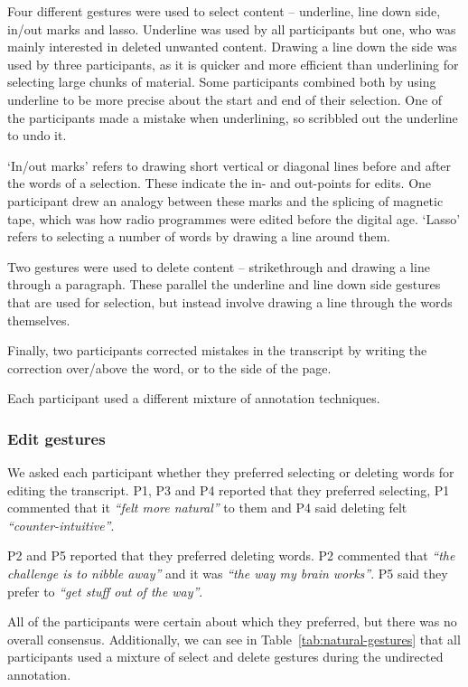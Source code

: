 Four different gestures were used to select content -- underline, line down side, in/out marks and lasso.  Underline
was used by all participants but one, who was mainly interested in deleted unwanted content.  Drawing a line down the
side was used by three participants, as it is quicker and more efficient than underlining for selecting large chunks of
material.  Some participants combined both by using underline to be more precise about the start and end of their
selection.  One of the participants made a mistake when underlining, so scribbled out the underline to undo it.

`In/out marks' refers to drawing short vertical or diagonal lines before and after the words of a selection. These
indicate the in- and out-points for edits. One participant drew an analogy between these marks and the splicing of
magnetic tape, which was how radio programmes were edited before the digital age. `Lasso' refers to selecting a number
of words by drawing a line around them.

Two gestures were used to delete content -- strikethrough and drawing a line through a paragraph. These parallel the
underline and line down side gestures that are used for selection, but instead involve drawing a line through the words
themselves.

Finally, two participants corrected mistakes in the transcript by writing the correction over/above the
word, or to the side of the page.

Each participant used a different mixture of annotation techniques.

\subsubsection{Edit gestures}\label{sec:paper-proto-edit-gestures}
We asked each participant whether they preferred selecting or deleting words for editing the transcript.  P1, P3 and P4
reported that they preferred selecting, P1 commented that it \textit{``felt more natural''} to them and P4 said
deleting felt \textit{``counter-intuitive''}.

P2 and P5 reported that they preferred deleting words. P2 commented that \textit{``the challenge is to nibble away''}
and it was \textit{``the way my brain works''}. P5 said they prefer to \textit{``get stuff out of the way''}.

All of the participants were certain about which they preferred, but there was no overall consensus. Additionally, we
can see in Table~\ref{tab:natural-gestures} that all participants used a mixture of select and delete gestures during
the undirected annotation.

